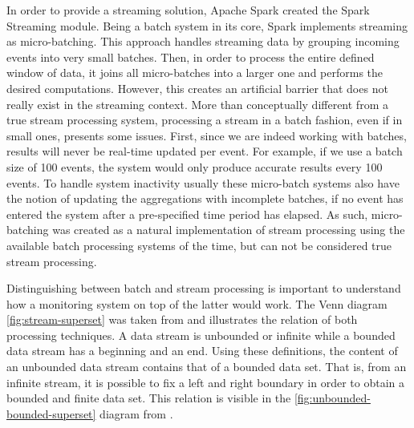 In order to provide a streaming solution, Apache Spark created the Spark Streaming module. Being a batch system in its core, Spark implements streaming as micro-batching. This approach handles streaming data by grouping incoming events into very small batches. Then, in order to process the entire defined window of data, it joins all micro-batches into a larger one and performs the desired computations. However, this creates an artificial barrier that does not really exist in the streaming context. More than conceptually different from a true stream processing system, processing a stream in a batch fashion, even if in small ones, presents some issues. First, since we are indeed working with batches, results will never be real-time updated per event. For example, if we use a batch size of 100 events, the system would only produce accurate results every 100 events. To handle system inactivity usually these micro-batch systems also have the notion of updating the aggregations with incomplete batches, if no event has entered the system after a pre-specified time period has elapsed. As such, micro-batching was created as a natural implementation of stream processing using the available batch processing systems of the time, but can not be considered true stream processing.

Distinguishing between batch and stream processing is important to understand how a monitoring system on top of the latter would work. The Venn diagram \ref{fig:stream-superset} was taken from \cite{batch-is-a-special-case-of-streaming} and illustrates the relation of both processing techniques. A data stream is unbounded or infinite while a bounded data stream has a beginning and an end. Using these definitions, the content of an unbounded data stream contains that of a bounded data set. That is, from an infinite stream, it is possible to fix a left and right boundary in order to obtain a bounded and finite data set. This relation is visible in the \ref{fig:unbounded-bounded-superset} diagram from \cite{batch-is-a-special-case-of-streaming}.

